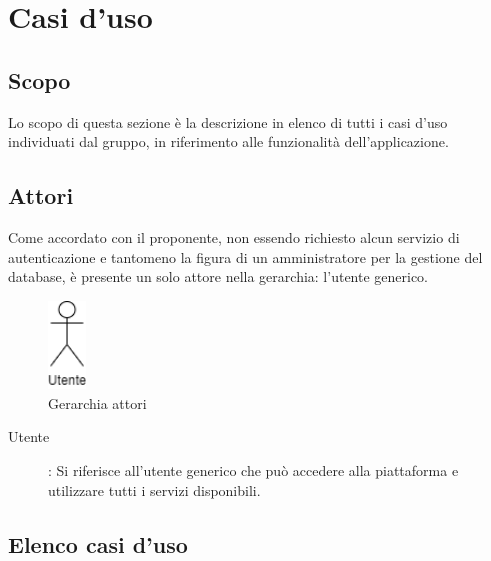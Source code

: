 \section{Casi d'uso}
\subsection{Scopo}
Lo scopo di questa sezione è la descrizione in elenco di tutti i casi d'uso individuati dal gruppo, in riferimento alle funzionalità dell'applicazione.
\subsection{Attori}
Come accordato con il proponente, non essendo richiesto alcun servizio di autenticazione e tantomeno la figura di un amministratore per la gestione del database, è presente un solo attore nella gerarchia: l'utente generico.

\begin{figure}[h]
\includegraphics[width=1cm]{section/Images/Utente.png}
\centering
\caption{Gerarchia attori}
\end{figure}

\begin{description}
\item[Utente]:
Si riferisce all'utente generico che può accedere alla piattaforma e utilizzare tutti i servizi disponibili.
\end{description}

\newpage
\subsection{Elenco casi d'uso}




















